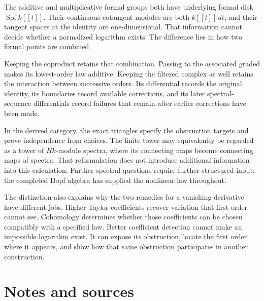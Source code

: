\documentclass[11pt,letterpaper]{article}
\begin{document}
The additive and multiplicative formal groups both have underlying formal disk \(
\operatorname{Spf}k[[t]]
\). Their continuous cotangent modules are both \(
k[[t]]\,dt
\), and their tangent spaces at the identity are one-dimensional. That information cannot decide whether a normalized logarithm exists. The difference lies in how two formal points are combined.

Keeping the coproduct retains that combination. Passing to the associated graded makes its lowest-order law additive. Keeping the filtered complex as well retains the interaction between successive orders. Its differential records the original identity, its boundaries record available corrections, and its later spectral-sequence differentials record failures that remain after earlier corrections have been made.


In the derived category, the exact triangles specify the obstruction targets and prove independence from choices. The finite tower may equivalently be regarded as a tower of \(
Hk
\)-module spectra, where its connecting maps become connecting maps of spectra. That reformulation does not introduce additional information into this calculation. Further spectral questions require further structured input; the completed Hopf algebra has supplied the nonlinear law throughout.


The distinction also explains why the two remedies for a vanishing derivative have different jobs. Higher Taylor coefficients recover variation that first order cannot see. Cohomology determines whether those coefficients can be chosen compatibly with a specified law. Better coefficient detection cannot make an impossible logarithm exist. It can expose its obstruction, locate the first order where it appears, and show how that same obstruction participates in another construction.



\clearpage\section*{Notes and sources}\hypertarget{notes-and-sources}{}
\end{document}
